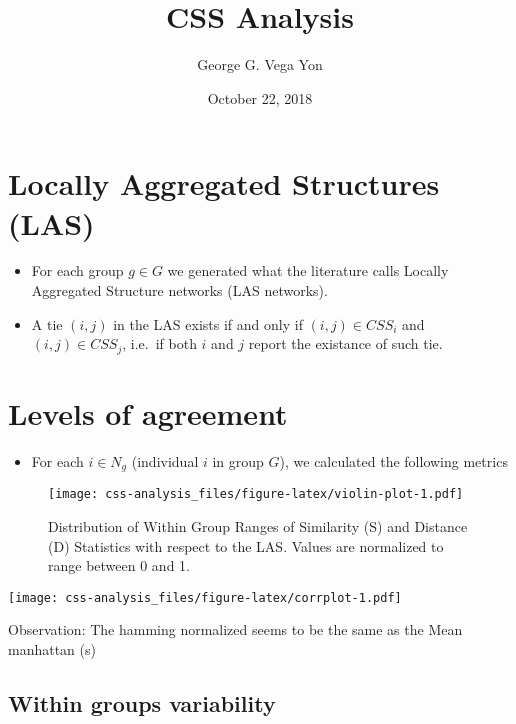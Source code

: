 \documentclass[]{article}
\title{CSS Analysis}
\author{George G. Vega Yon}
\date{October 22, 2018}
\providecommand{\tightlist}{%
  \setlength{\itemsep}{0pt}\setlength{\parskip}{0pt}}
\begin{document}
\maketitle

\renewcommand{\familydefault}{\sfdefault}

\hypertarget{locally-aggregated-structures-las}{%
\section{Locally Aggregated Structures
(LAS)}\label{locally-aggregated-structures-las}}

\begin{itemize}
\item
  For each group \(g \in G\) we generated what the literature calls
  Locally Aggregated Structure networks (LAS networks).
\item
  A tie \((i,j)\) in the LAS exists if and only if \((i,j) \in CSS_i\)
  and \((i,j) \in CSS_j\), i.e.~if both \(i\) and \(j\) report the
  existance of such tie.
\end{itemize}

\hypertarget{levels-of-agreement}{%
\section{Levels of agreement}\label{levels-of-agreement}}

\begin{itemize}
\tightlist
\item
  For each \(i \in N_g\) (individual \(i\) in group \(G\)), we
  calculated the following metrics
\end{itemize}

\begin{figure}
\centering
\texttt{[image: css-analysis\_files/figure-latex/violin-plot-1.pdf]}
\caption{Distribution of Within Group Ranges of Similarity (S) and
Distance (D) Statistics with respect to the LAS. Values are normalized
to range between 0 and 1.}
\end{figure}

\texttt{[image: css-analysis\_files/figure-latex/corrplot-1.pdf]}

Observation: The hamming normalized seems to be the same as the Mean
manhattan (s)

\hypertarget{within-groups-variability}{%
\subsection{Within groups variability}\label{within-groups-variability}}
\end{document}
